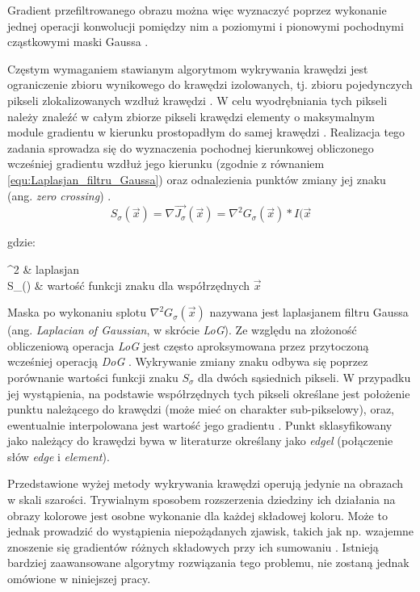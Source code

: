 Gradient przefiltrowanego obrazu można więc wyznaczyć poprzez wykonanie jednej operacji konwolucji pomiędzy nim a poziomymi i pionowymi pochodnymi cząstkowymi maski Gaussa \cite{Szeliski2011}.

Częstym wymaganiem stawianym algorytmom wykrywania krawędzi jest ograniczenie zbioru wynikowego do krawędzi izolowanych, tj. zbioru pojedynczych pikseli zlokalizowanych wzdłuż krawędzi \cite{Szeliski2011}. W celu wyodrębniania tych pikseli należy znaleźć w całym zbiorze pikseli krawędzi elementy o maksymalnym module gradientu w kierunku prostopadłym do samej krawędzi \cite{Szeliski2011}. Realizacja tego zadania sprowadza się do wyznaczenia pochodnej kierunkowej obliczonego wcześniej gradientu wzdłuż jego kierunku (zgodnie z równaniem \ref{equ:Laplasjan_filtru_Gaussa}) oraz odnalezienia punktów zmiany jej znaku (ang. \textit{zero crossing}) \cite{Szeliski2011}.
\begin{equation}
\label{equ:Laplasjan_filtru_Gaussa}
	S_\sigma (\vec{x}) = \nabla \vec{J_{\sigma}} (\vec{x}) = \nabla^2 G_\sigma (\vec{x}) \ast I(\vec{x}
\end{equation}

\noindent
gdzie:

\begin{conditions}
	\nabla^2 & laplasjan \\
	S_\sigma () & wartość funkcji znaku dla współrzędnych $\vec{x}$ \\
\end{conditions}

Maska po wykonaniu splotu $\nabla^2 G_\sigma (\vec{x})$ nazywana jest laplasjanem filtru Gaussa (ang. \textit{Laplacian of Gaussian}, w skrócie \textit{LoG}). Ze względu na złożoność obliczeniową operacja \textit{LoG} jest często aproksymowana przez przytoczoną wcześniej operacją \textit{DoG} \cite{Szeliski2011}. Wykrywanie zmiany znaku odbywa się poprzez porównanie wartości funkcji znaku $S_\sigma$ dla dwóch sąsiednich pikseli. W przypadku jej wystąpienia, na podstawie współrzędnych tych pikseli określane jest położenie punktu należącego do krawędzi (może mieć on charakter sub-pikselowy), oraz, ewentualnie interpolowana jest wartość jego gradientu \cite{Szeliski2011}. Punkt sklasyfikowany jako należący do krawędzi bywa w literaturze określany jako \textit{edgel} \cite{Szeliski2011} (połączenie słów \textit{edge} i \textit{element}).

Przedstawione wyżej metody wykrywania krawędzi operują jedynie na obrazach w skali szarości. Trywialnym sposobem rozszerzenia dziedziny ich działania na obrazy kolorowe jest osobne wykonanie dla każdej składowej koloru. Może to jednak prowadzić do wystąpienia niepożądanych zjawisk, takich jak np. wzajemne znoszenie się gradientów różnych składowych przy ich sumowaniu \cite{Szeliski2011}. Istnieją bardziej zaawansowane algorytmy rozwiązania tego problemu, nie zostaną jednak omówione w niniejszej pracy. 

